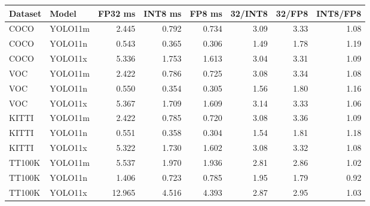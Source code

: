 \begin{tabular}{llrrrrrr}
\toprule
Dataset & Model & FP32 ms & INT8 ms & FP8 ms & 32/INT8 & 32/FP8 & INT8/FP8 \\
\midrule
COCO & YOLO11m & 2.445 & 0.792 & 0.734 & 3.09 & 3.33 & 1.08 \\
COCO & YOLO11n & 0.543 & 0.365 & 0.306 & 1.49 & 1.78 & 1.19 \\
COCO & YOLO11x & 5.336 & 1.753 & 1.613 & 3.04 & 3.31 & 1.09 \\
VOC & YOLO11m & 2.422 & 0.786 & 0.725 & 3.08 & 3.34 & 1.08 \\
VOC & YOLO11n & 0.550 & 0.354 & 0.305 & 1.56 & 1.80 & 1.16 \\
VOC & YOLO11x & 5.367 & 1.709 & 1.609 & 3.14 & 3.33 & 1.06 \\
KITTI & YOLO11m & 2.422 & 0.785 & 0.720 & 3.08 & 3.36 & 1.09 \\
KITTI & YOLO11n & 0.551 & 0.358 & 0.304 & 1.54 & 1.81 & 1.18 \\
KITTI & YOLO11x & 5.322 & 1.730 & 1.602 & 3.08 & 3.32 & 1.08 \\
TT100K & YOLO11m & 5.537 & 1.970 & 1.936 & 2.81 & 2.86 & 1.02 \\
TT100K & YOLO11n & 1.406 & 0.723 & 0.785 & 1.95 & 1.79 & 0.92 \\
TT100K & YOLO11x & 12.965 & 4.516 & 4.393 & 2.87 & 2.95 & 1.03 \\
\bottomrule
\end{tabular}

